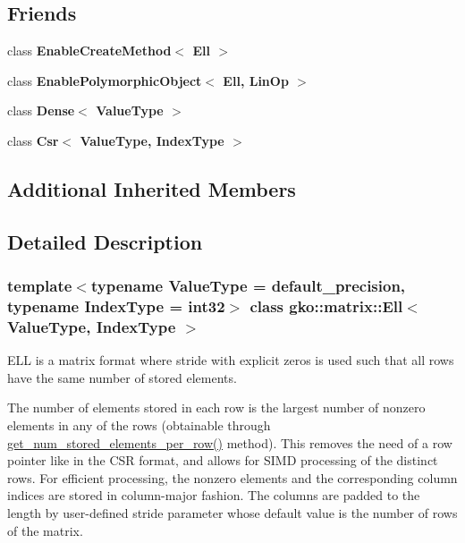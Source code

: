 \subsection*{Friends}
\begin{DoxyCompactItemize}
\item 
\mbox{\label{classgko_1_1matrix_1_1Ell_aff1f69cf59ce70d0ad4ccd5fc854c616}} 
class {\bfseries Enable\+Create\+Method$<$ Ell $>$}
\item 
\mbox{\label{classgko_1_1matrix_1_1Ell_a71537fa3276ed9af486b2167b456f511}} 
class {\bfseries Enable\+Polymorphic\+Object$<$ Ell, Lin\+Op $>$}
\item 
\mbox{\label{classgko_1_1matrix_1_1Ell_a22a84c8f67f946aa60a2fa8bf5835a32}} 
class {\bfseries Dense$<$ Value\+Type $>$}
\item 
\mbox{\label{classgko_1_1matrix_1_1Ell_a3962faf971a3df6ff4c9226c61fb24cc}} 
class {\bfseries Csr$<$ Value\+Type, Index\+Type $>$}
\end{DoxyCompactItemize}
\subsection*{Additional Inherited Members}


\subsection{Detailed Description}
\subsubsection*{template$<$typename Value\+Type = default\+\_\+precision, typename Index\+Type = int32$>$\newline
class gko\+::matrix\+::\+Ell$<$ Value\+Type, Index\+Type $>$}

E\+LL is a matrix format where stride with explicit zeros is used such that all rows have the same number of stored elements. 

The number of elements stored in each row is the largest number of nonzero elements in any of the rows (obtainable through \hyperlink{classgko_1_1matrix_1_1Ell_a08f9b04b356e58ab57d03ce335ff11ce}{get\+\_\+num\+\_\+stored\+\_\+elements\+\_\+per\+\_\+row()} method). This removes the need of a row pointer like in the C\+SR format, and allows for S\+I\+MD processing of the distinct rows. For efficient processing, the nonzero elements and the corresponding column indices are stored in column-\/major fashion. The columns are padded to the length by user-\/defined stride parameter whose default value is the number of rows of the matrix.


